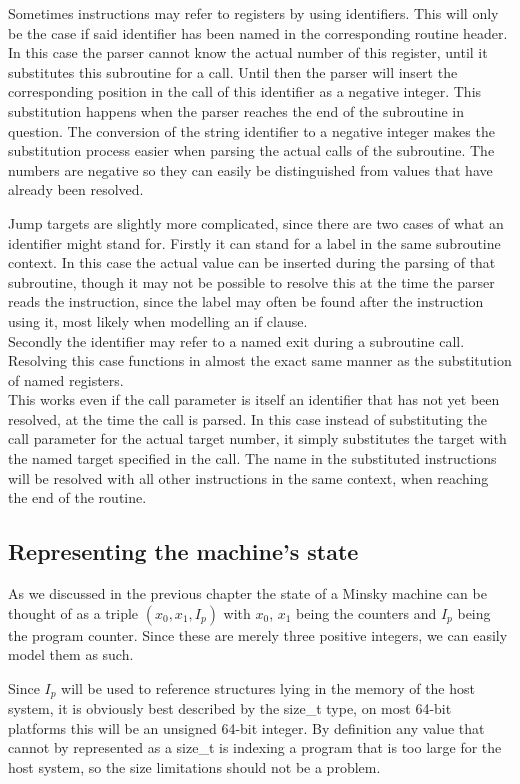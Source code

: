 Sometimes instructions may refer to registers by using identifiers. This will only be the case if said identifier has been named in the corresponding routine header. In this case the parser cannot know the actual number of this register, until it substitutes this subroutine for a call. Until then the parser will insert the corresponding position in the call of this identifier as a negative integer. This substitution happens when the parser reaches the end of the subroutine in question. The conversion of the string identifier to a negative integer makes the substitution process easier when parsing the actual calls of the subroutine. The numbers are negative so they can easily be distinguished from values that have already been resolved.

Jump targets are slightly more complicated, since there are two cases of what an identifier might stand for. Firstly it can stand for a label in the same subroutine context. In this case the actual value can be inserted during the parsing of that subroutine, though it may not be possible to resolve this at the time the parser reads the instruction, since the label may often be found after the instruction using it, most likely when modelling an if clause.\\
Secondly the identifier may refer to a named exit during a subroutine call. Resolving this case functions in almost the exact same manner as the substitution of named registers.\\
This works even if the call parameter is itself an identifier that has not yet been resolved, at the time the call is parsed. In this case instead of substituting the call parameter for the actual target number, it simply substitutes the target with the named target specified in the call. The name in the substituted instructions will be resolved with all other instructions in the same context, when reaching the end of the routine.

\subsection{Representing the machine's state}
As we discussed in the previous chapter the state of a Minsky machine can be thought of as a triple $(x_0, x_1, I_p)$ with $x_0$, $x_1$ being the counters and $I_p$ being the program counter. Since these are merely three positive integers, we can easily model them as such.

Since $I_p$ will be used to reference structures lying in the memory of the host system, it is obviously best described by the size\_t type, on most 64-bit platforms this will be an unsigned 64-bit integer. By definition any value that cannot by represented as a size\_t is indexing a program that is too large for the host system, so the size limitations should not be a problem.

